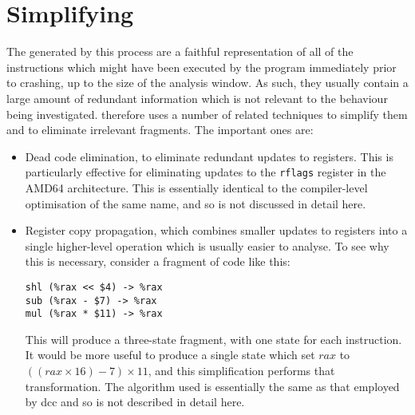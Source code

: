 \section{Simplifying {\StateMachines}}

The {\StateMachines} generated by this process are a faithful
representation of all of the instructions which might have been
executed by the program immediately prior to crashing, up to the size
of the analysis window.  As such, they usually contain a large amount
of redundant information which is not relevant to the behaviour being
investigated.  {\Technique} therefore uses a number of related
techniques to simplify them and to eliminate irrelevant fragments.
The important ones are:

\begin{itemize}
\item
  Dead code elimination, to eliminate redundant updates to registers.
  This is particularly effective for eliminating updates to the
  \verb|rflags| register in the AMD64 architecture. This is
  essentially identical to the compiler-level optimisation of the same
  name\needCite{}, and so is not discussed in detail here.
\item
  Register copy propagation, which combines smaller updates to
  registers into a single higher-level operation which is usually
  easier to analyse.  To see why this is necessary, consider
  a fragment of code like this:

\begin{verbatim}
shl (%rax << $4) -> %rax
sub (%rax - $7) -> %rax
mul (%rax * $11) -> %rax
\end{verbatim}
  
  This will produce a three-state {\StateMachine} fragment, with one
  state for each instruction.  It would be more useful to produce a
  single state which set $rax$ to $((rax \times 16) - 7) \times 11$,
  and this simplification performs that transformation.  The algorithm
  used is essentially the same as that employed by dcc\needCite{} and
  so is not described in detail here.


\end{itemize}
